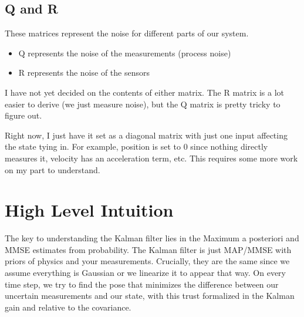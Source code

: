 \documentclass{article}
\begin{document}
\subsection{Q and R}
These matrices represent the noise for different parts of our system.
\begin{itemize}
    \item Q represents the noise of the measurements (process noise)
    \item R represents the noise of the sensors
\end{itemize}
I have not yet decided on the contents of either matrix. The R matrix is a lot easier to derive (we just measure noise), but the Q matrix is pretty tricky to figure out.

Right now, I just have it set as a diagonal matrix with just one input affecting the state tying in. For example, position is set to 0 since nothing directly measures it, velocity has an acceleration term, etc. This requires some more work on my part to understand.


\section{High Level Intuition}
The key to understanding the Kalman filter lies in the Maximum a posteriori and MMSE estimates from probability. The Kalman filter is just MAP/MMSE with priors of physics and your measurements. Crucially, they are the same since we assume everything is Gaussian or we linearize it to appear that way. On every time step, we try to find the pose that minimizes the difference between our uncertain measurements and our state, with this trust formalized in the Kalman gain and relative to the covariance.
\end{document}
